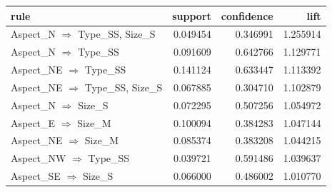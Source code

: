 \begin{tabular}{lrrr}
\toprule
rule & support & confidence & lift \\
\midrule
Aspect\_N $\Rightarrow$ Type\_SS, Size\_S & 0.049454 & 0.346991 & 1.255914 \\
Aspect\_N $\Rightarrow$ Type\_SS & 0.091609 & 0.642766 & 1.129771 \\
Aspect\_NE $\Rightarrow$ Type\_SS & 0.141124 & 0.633447 & 1.113392 \\
Aspect\_NE $\Rightarrow$ Type\_SS, Size\_S & 0.067885 & 0.304710 & 1.102879 \\
Aspect\_N $\Rightarrow$ Size\_S & 0.072295 & 0.507256 & 1.054972 \\
Aspect\_E $\Rightarrow$ Size\_M & 0.100094 & 0.384283 & 1.047144 \\
Aspect\_NE $\Rightarrow$ Size\_M & 0.085374 & 0.383208 & 1.044215 \\
Aspect\_NW $\Rightarrow$ Type\_SS & 0.039721 & 0.591486 & 1.039637 \\
Aspect\_SE $\Rightarrow$ Size\_S & 0.066000 & 0.486002 & 1.010770 \\
\bottomrule
\end{tabular}
